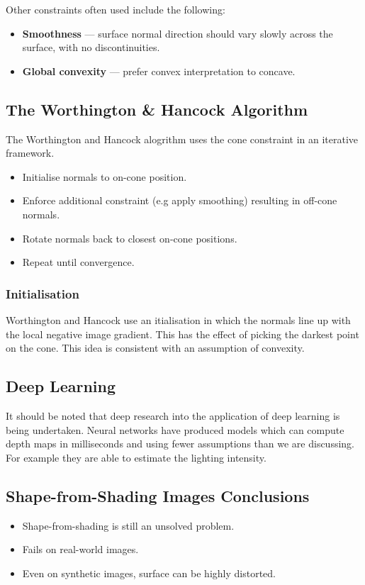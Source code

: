 \documentclass{article}
\begin{document}
Other constraints often used include the following:
\begin{itemize}
	\item \textbf{Smoothness} --- surface normal direction should vary slowly across the surface, with no discontinuities.
	\item \textbf{Global convexity} --- prefer convex interpretation to concave.
\end{itemize}

\subsection{The Worthington \& Hancock Algorithm}
The Worthington and Hancock alogrithm uses the cone constraint in an iterative framework.
\begin{itemize}
	\item Initialise normals to on-cone position.
	\item Enforce additional constraint (e.g apply smoothing) resulting in off-cone normals.
	\item Rotate normals back to closest on-cone positions.
	\item Repeat until convergence.
\end{itemize}

\subsubsection{Initialisation}
Worthington and Hancock use an itialisation in which the normals line up with the local negative image gradient.
This has the effect of picking the darkest point on the cone.
This idea is consistent with an assumption of convexity.

\subsection{Deep Learning}
It should be noted that deep research into the application of deep learning is being undertaken.
Neural networks have produced models which can compute depth maps in milliseconds and using fewer assumptions than we are discussing.
For example they are able to estimate the lighting intensity.

\subsection{Shape-from-Shading Images Conclusions}
\begin{itemize}
	\item Shape-from-shading is still an unsolved problem.
	\item Fails on real-world images.
	\item Even on synthetic images, surface can be highly distorted.
\end{itemize}
\end{document}
